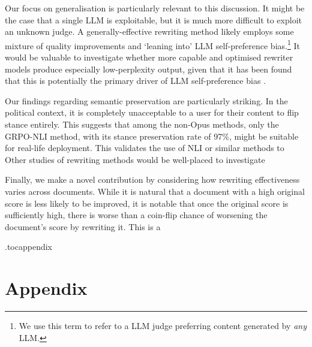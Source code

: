 \documentclass{article}
\begin{document}
Our focus on generalisation is particularly relevant to this discussion. It might be the case that a single LLM is exploitable, but it is much more difficult to exploit an unknown judge. A generally-effective rewriting method likely employs some mixture of quality improvements and `leaning into' LLM self-preference bias.\footnote{We use this term to refer to a LLM judge preferring content generated by \textit{any} LLM.} It would be valuable to investigate whether more capable and optimised rewriter models produce especially low-perplexity output, given that it has been found that this is potentially the primary driver of LLM self-preference bias \citep{wataokaSelfPreferenceBiasLLMasaJudge2025}.

Our findings regarding semantic preservation are particularly striking. In the political context, it is completely unacceptable to a user for their content to flip stance entirely. This suggests that among the non-Opus methods, only the GRPO-NLI method, with its stance preservation rate of 97\%, might be suitable for real-life deployment. This validates the use of NLI or similar methods to Other studies of rewriting methods would be well-placed to investigate

Finally, we make a novel contribution by considering how rewriting effectiveness varies across documents. While it is natural that a document with a high original score is less likely to be improved, it is notable that once the original score is sufficiently high, there is worse than a coin-flip chance of worsening the document's score by rewriting it. This is a 

\printbibliography

\appendix

\etocdepthtag.toc{appendix}


\newpage
{}\label{app:toc}
\section*{Appendix}
\tableofcontents


\end{document}
